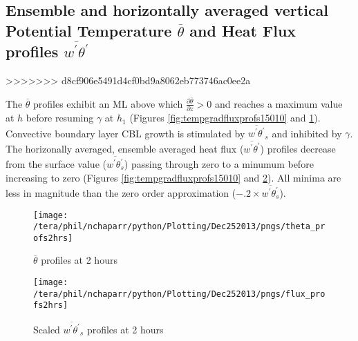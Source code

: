 \clearpage

\subsection{Ensemble and horizontally averaged vertical Potential Temperature $\overline{\theta}$ 
and Heat Flux profiles $\overline{w^{'}\theta^{'}}$}
>>>>>>> d8cf906e5491d4cf0bd9a8062eb773746ac0ee2a
\FloatBarrier

The $\overline{\theta}$ profiles exhibit an \acs{ML} above which  $\frac{\partial\overline{\theta}}{\partial z}>0$ 
and reaches a maximum value at $h$ before resuming $\gamma$  at $h_{1}$ 
(Figures \ref{fig:tempgradfluxprofs15010} and \ref{fig:pottempprofs2hrs}).  Convective boundary layer \acs{CBL} growth is stimulated 
by $\overline{w^{'}\theta^{'}}_{s}$ and inhibited by $\gamma$.\\

The horizonally averaged, ensemble averaged heat flux ($\overline{w^{'}\theta^{'}}$) profiles decrease 
from the surface value ($\overline{w^{'}\theta^{'}_{s}}$) passing through zero to a minumum before 
increasing to zero (Figures \ref{fig:tempgradfluxprofs15010} and  \ref{fig:fluxprofs2hrs}).  All minima are 
less  in magnitude than the zero order approximation ($-.2 \times \overline{w^{'}\theta^{'}_{s}}$).\\


\begin{figure}[htbp]
    \centering
    \texttt{[image: /tera/phil/nchaparr/python/Plotting/Dec252013/pngs/theta\_profs2hrs]}
    \caption{$\overline{\theta}$ profiles at 2 hours}
    \label{fig:pottempprofs2hrs}   %
\end{figure}

\begin{figure}[htbp]
    \centering
    \texttt{[image: /tera/phil/nchaparr/python/Plotting/Dec252013/pngs/flux\_profs2hrs]}
    \caption{Scaled $\overline{w^{'}\theta^{'}}_{s}$ profiles at 2 hours}
    \label{fig:fluxprofs2hrs}   %
\end{figure}


